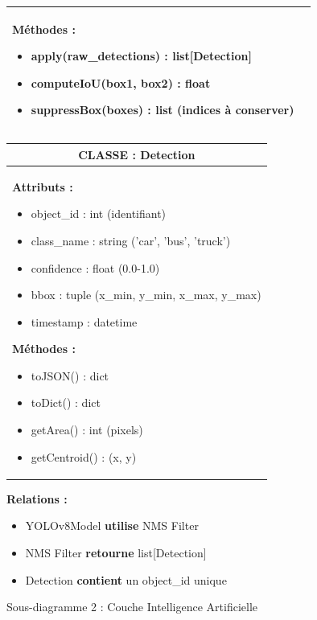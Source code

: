 \begin{figure}[H]
{\begin{minipage}{0.95\textwidth}
\begin{tabular}{|p{2.5cm}|p{7cm}|}
{    \textbf{Méthodes :}
    \begin{itemize}
        \item apply(raw\_detections) : list[Detection]
        \item computeIoU(box1, box2) : float
        \item suppressBox(boxes) : list (indices à conserver)
    \end{itemize}
    } \\
    \hline
    \end{tabular}
    
    \vspace{0.5cm}
    
    \begin{tabular}{|p{2.5cm}|p{7cm}|}
    \hline
    \multicolumn{2}{|c|}{\textbf{CLASSE : Detection}} \\
    \hline
    \multicolumn{2}{|p{9.5cm}|}{
    \textbf{Attributs :}
    \begin{itemize}
        \item object\_id : int (identifiant)
        \item class\_name : string ('car', 'bus', 'truck')
        \item confidence : float (0.0-1.0)
        \item bbox : tuple (x\_min, y\_min, x\_max, y\_max)
        \item timestamp : datetime
    \end{itemize}
    
    \textbf{Méthodes :}
    \begin{itemize}
        \item toJSON() : dict
        \item toDict() : dict
        \item getArea() : int (pixels)
        \item getCentroid() : (x, y)
    \end{itemize}
    } \\
    \hline
    \end{tabular}
    
    \vspace{0.5cm}
    
    \textbf{Relations :}
    \begin{itemize}
        \item YOLOv8Model \textbf{utilise} NMS Filter
        \item NMS Filter \textbf{retourne} list[Detection]
        \item Detection \textbf{contient} un object\_id unique
    \end{itemize}
    
    \end{minipage}}
    \caption{Sous-diagramme 2 : Couche Intelligence Artificielle}
    \label{fig:class-ia}
\end{figure}

